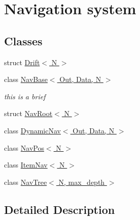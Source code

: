 \hypertarget{group__Navigation}{}\section{Navigation system}
\label{group__Navigation}
\subsection*{Classes}
\begin{DoxyCompactItemize}
\item 
struct \hyperlink{structDrift}{Drift$<$ N $>$}
\item 
class \hyperlink{classNavBase}{Nav\+Base$<$ Out, Data, N $>$}
\begin{DoxyCompactList}\small\item\em this is a brief \end{DoxyCompactList}\item 
struct \hyperlink{structNavRoot}{Nav\+Root$<$ N $>$}
\item 
class \hyperlink{classDynamicNav}{Dynamic\+Nav$<$ Out, Data, N $>$}
\item 
class \hyperlink{classNavPos}{Nav\+Pos$<$ N $>$}
\item 
class \hyperlink{classItemNav}{Item\+Nav$<$ N $>$}
\item 
class \hyperlink{classNavTree}{Nav\+Tree$<$ N, max\+\_\+depth $>$}
\end{DoxyCompactItemize}


\subsection{Detailed Description}
